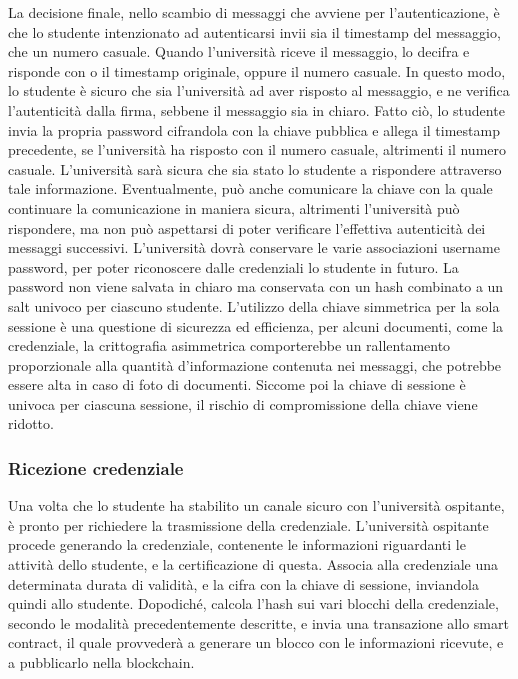 \documentclass[a4paper,12pt]{article}
\begin{document}
\newline La decisione finale, nello scambio di messaggi che avviene per l'autenticazione, è che lo studente intenzionato ad autenticarsi invii sia il timestamp del messaggio, che un numero casuale. Quando l'università riceve il messaggio, lo decifra e risponde con o il timestamp originale, oppure il numero casuale. In questo modo, lo studente è sicuro che sia l'università ad aver risposto al messaggio, e ne verifica l'autenticità dalla firma, sebbene il messaggio sia in chiaro. Fatto ciò, lo studente invia la propria password cifrandola con la chiave pubblica e allega il timestamp precedente, se l'università ha risposto con il numero casuale, altrimenti il numero casuale. L'università sarà sicura che sia stato lo studente a rispondere attraverso tale informazione. Eventualmente, può anche comunicare la chiave con la quale continuare la comunicazione in maniera sicura, altrimenti l'università può rispondere, ma non può aspettarsi di poter verificare l'effettiva autenticità dei messaggi successivi.
\newline L'università dovrà conservare le varie associazioni username password, per poter riconoscere dalle credenziali lo studente in futuro. La password non viene salvata in chiaro ma conservata con un hash combinato a un salt univoco per ciascuno studente.
\newline L'utilizzo della chiave simmetrica per la sola sessione è una questione di sicurezza ed efficienza, per alcuni documenti, come la credenziale, la crittografia asimmetrica comporterebbe un rallentamento proporzionale alla quantità d'informazione contenuta nei messaggi, che potrebbe essere alta in caso di foto di documenti. Siccome poi la chiave di sessione è univoca per ciascuna sessione, il rischio di compromissione della chiave viene ridotto.
\subsubsection{Ricezione credenziale}
Una volta che lo studente ha stabilito un canale sicuro con l'università ospitante, è pronto per richiedere la trasmissione della credenziale. L'università ospitante procede generando la credenziale, contenente le informazioni riguardanti le attività dello studente, e la certificazione di questa. Associa alla credenziale una determinata durata di validità, e la cifra con la chiave di sessione, inviandola quindi allo studente. Dopodiché, calcola l'hash sui vari blocchi della credenziale, secondo le modalità precedentemente descritte, e invia una transazione allo smart contract, il quale provvederà a generare un blocco con le informazioni ricevute, e a pubblicarlo nella blockchain.
\end{document}
